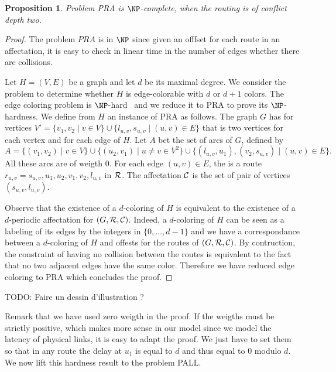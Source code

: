 \documentclass[a4paper,10pt]{article}
\newtheorem{proposition}{Proposition}
\newcommand{\todo}[1]{{\color{red} TODO: {#1}}}
\begin{document}
 

 \begin{proposition}
Problem PRA is $\NP$-complete, when the routing is of conflict depth two.
\end{proposition}
 \begin{proof}
 The problem $PRA$ is in $\NP$ since given an offfset for each route in an affectation, it is easy to check in linear time in the number of edges whether there are collisions.
 
  Let $H=(V,E)$ be a graph and let $d$ be its maximal degree. We consider the problem to determine whether $H$ is edge-colorable
  with $d$ or $d+1$ colors. The edge coloring problem is $\NP$-hard~\cite{holyer1981np} and we reduce it to PRA to prove its $\NP$-hardness. We define from $H$ an instance of PRA as follows. The graph $G$ has for vertices $V'= \{ v_1, v_2 \mid v \in V  \} \cup \{ l_{u,v}, s_{u,v} \mid (u,v) \in E \}$ that is two vertices for each vertex and for each edge of $H$. 
  Let $A$ bet the set of arcs of $G$, defined by 
  $$A = \{(v_1,v_2) \mid v\in V\} \cup \{(u_2,v_1)\mid u \neq v \in V^2\} \cup \{(l_{u,v},u_1),(v_2,s_{u,v}) \mid (u,v) \in E \}. $$
  All these arcs are of weigth $0$. 
  For each edge $(u,v) \in E$, the is a route $r_{u,v} = s_{u,v},u_1,u_2,v_1,v_2,l_{u,v}$ in ${\cal R}$.  
  The affectation ${\cal C}$ is the set of pair of vertices $(s_{u,v}, l_{u,v})$.
    
  Observe that the existence of a $d$-coloring of $H$ is equivalent to the existence of a $d$-periodic affectation
  for $(G,{\cal R},{\cal C})$. Indeed, a $d$-coloring of $H$ can be seen as a labeling of its edges by the integers
  in $\{0,\dots,d-1\}$ and we have a correspondance between a $d$-coloring of $H$ and offests for the routes of $(G,{\cal R},{\cal C})$.
  By contruction, the constraint of having no collision between the routes is equivalent to the fact that no two adjacent edges have
  the same color. Therefore we have reduced edge coloring to PRA which concludes the proof. 
 \end{proof}
 \todo{Faire un dessin d'illustration ?}
 
 Remark that we have used zero weigth in the proof. If the weigths must be strictly positive, which makes more sense in our model since
 we model the latency of physical links, it is easy to adapt the proof. We just have to set them so that in any route the delay at $u_1$ is equal to $d$ and thus equal to $0$ modulo $d$. We now lift this hardness result to the problem PALL.
\end{document}

